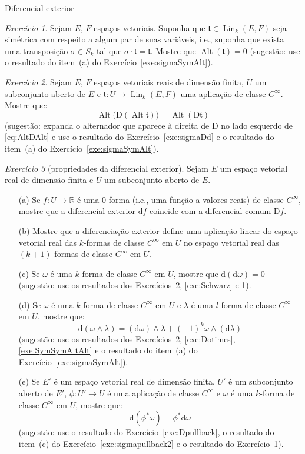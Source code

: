 \documentclass[oneside,11pt]{amsart}
\newcommand{\R}{\mathds R}
\newcommand{\dd}{\mathrm d}
\newcommand{\Dd}{\mathrm D}
\DeclareMathOperator{\Lin}{Lin}
\DeclareMathOperator{\Alt}{Alt}
\theoremstyle{remark}\newtheorem{exercise}{Exercício}[section]
\theoremstyle{plain}\newtheorem{teo}{Teorema}[section]
\theoremstyle{plain}\newtheorem{lem}[teo]{Lema}
\theoremstyle{plain}\newtheorem{prop}[teo]{Proposição}
\theoremstyle{definition}\newtheorem{defin}[teo]{Definição}
\theoremstyle{remark}\newtheorem{rem}[teo]{Observação}
\theoremstyle{definition}\newtheorem{example}[teo]{Exemplo}
\numberwithin{equation}{section}
\begin{document}
\begin{section}{Diferencial exterior}
\begin{exercise}\label{exe:KerAlt}
Sejam $E$, $F$ espaços vetoriais. Suponha que $\mathfrak t\in\Lin_k(E,F)$ seja simétrica com respeito a algum par de suas variáveis, i.e., suponha que
exista uma transposição $\sigma\in S_k$ tal que $\sigma\cdot\mathfrak t=\mathfrak t$. Mostre que $\Alt(\mathfrak t)=0$ (sugestão: use o resultado do
item~(a) do Exercício~\ref{exe:sigmaSymAlt}).
\end{exercise}

\begin{exercise}\label{exe:AltDAlt}
Sejam $E$, $F$ espaços vetoriais reais de dimensão finita, $U$ um subconjunto aberto de $E$ e $\mathfrak t:U\to\Lin_k(E,F)$ uma aplicação de classe $C^\infty$.
Mostre que:
\begin{equation}\label{eq:AltDAlt}
\Alt\!\big(\Dd(\Alt\mathfrak t)\big)=\Alt(\Dd\mathfrak t)
\end{equation}
(sugestão: expanda o alternador que aparece à direita de $\Dd$ no lado esquerdo de \eqref{eq:AltDAlt} e use o resultado do Exercício~\ref{exe:sigmaDd}
e o resultado do item~(a) do Exercício~\ref{exe:sigmaSymAlt}).
\end{exercise}

\begin{exercise}[propriedades da diferencial exterior]\label{exe:propdifext}
Sejam $E$ um espaço vetorial real de dimensão finita e $U$ um subconjunto aberto de $E$.
\begin{itemize}
\item[(a)] Se $f:U\to\R$ é uma $0$-forma (i.e., uma função a valores reais) de classe $C^\infty$, mostre que a diferencial exterior $\dd f$ coincide
com a diferencial comum $\Dd f$.
\item[(b)] Mostre que a diferenciação exterior define uma aplicação linear do espaço vetorial real das $k$-formas de classe $C^\infty$ em $U$ no espaço
vetorial real das $(k+1)$-formas de classe $C^\infty$ em $U$.
\item[(c)] Se $\omega$ é uma $k$-forma de classe $C^\infty$ em $U$, mostre que $\dd(\dd\omega)=0$ (sugestão: use os resultados dos Exercícios~\ref{exe:AltDAlt},
\ref{exe:Schwarz} e \ref{exe:KerAlt}).
\item[(d)] Se $\omega$ é uma $k$-forma de classe $C^\infty$ em $U$ e $\lambda$ é uma $l$-forma de classe $C^\infty$ em $U$, mostre que:
\[\dd(\omega\wedge\lambda)=(\dd\omega)\wedge\lambda+(-1)^k\omega\wedge(\dd\lambda)\]
(sugestão: use os resultados dos Exercícios~\ref{exe:AltDAlt}, \ref{exe:Dotimes}, \ref{exe:SymSymAltAlt} e o resultado do item~(a) do Exercício~\ref{exe:sigmaSymAlt}).
\item[(e)] Se $E'$ é um espaço vetorial real de dimensão finita, $U'$ é um subconjunto aberto de $E'$, $\phi:U'\to U$ é uma aplicação de classe $C^\infty$
e $\omega$ é uma $k$-forma de classe $C^\infty$ em $U$, mostre que:
\[\dd(\phi^*\omega)=\phi^*\dd\omega\]
(sugestão: use o resultado do Exercício~\ref{exe:Dpullback}, o resultado do item~(c) do Exercício~\ref{exe:sigmapullback2}
e o resultado do Exercício~\ref{exe:KerAlt}).
\end{itemize}
\end{exercise}


\end{section}
\end{document}
